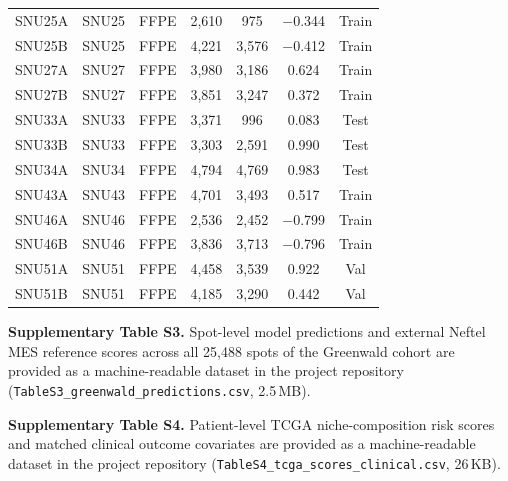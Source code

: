 \documentclass[11pt,letterpaper]{article}
\begin{document}
\begin{table}[H]
\begin{tabular}{llccccc}
SNU25A         & SNU25   & FFPE   & 2{,}610 & 975     & $-$0.344 & Train \\
SNU25B         & SNU25   & FFPE   & 4{,}221 & 3{,}576 & $-$0.412 & Train \\
SNU27A         & SNU27   & FFPE   & 3{,}980 & 3{,}186 & 0.624  & Train \\
SNU27B         & SNU27   & FFPE   & 3{,}851 & 3{,}247 & 0.372  & Train \\
SNU33A         & SNU33   & FFPE   & 3{,}371 & 996     & 0.083  & Test \\
SNU33B         & SNU33   & FFPE   & 3{,}303 & 2{,}591 & 0.990  & Test \\
SNU34A         & SNU34   & FFPE   & 4{,}794 & 4{,}769 & 0.983  & Test \\
SNU43A         & SNU43   & FFPE   & 4{,}701 & 3{,}493 & 0.517  & Train \\
SNU46A         & SNU46   & FFPE   & 2{,}536 & 2{,}452 & $-$0.799 & Train \\
SNU46B         & SNU46   & FFPE   & 3{,}836 & 3{,}713 & $-$0.796 & Train \\
SNU51A         & SNU51   & FFPE   & 4{,}458 & 3{,}539 & 0.922  & Val \\
SNU51B         & SNU51   & FFPE   & 4{,}185 & 3{,}290 & 0.442  & Val \\
\bottomrule
\end{tabular}
\end{table}

\vspace{1em}
\noindent\textbf{Supplementary Table S3.} Spot-level model predictions and external Neftel MES reference scores across all 25{,}488 spots of the Greenwald cohort are provided as a machine-readable dataset in the project repository (\texttt{TableS3\_}\allowbreak\texttt{greenwald\_}\allowbreak\texttt{predictions.csv}, 2.5\,MB).

\vspace{0.5em}
\begingroup\sloppy
\noindent\textbf{Supplementary Table S4.} Patient-level TCGA niche-composition risk scores and matched clinical outcome covariates are provided as a machine-readable dataset in the project repository (\texttt{TableS4\_}\allowbreak\texttt{tcga\_}\allowbreak\texttt{scores\_}\allowbreak\texttt{clinical.csv}, 26\,KB).
\par\endgroup

\clearpage
\end{document}
